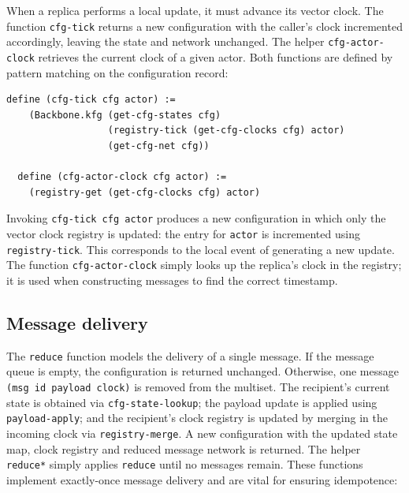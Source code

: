 When a replica performs a local update, it must advance its vector clock.  The function \lstinline{cfg-tick} returns a new configuration with the caller’s clock incremented accordingly, leaving the state and network unchanged.  The helper \lstinline{cfg-actor-clock} retrieves the current clock of a given actor.  Both functions are defined by pattern matching on the configuration record:

\begin{lstlisting}[language=Athena,style=athena]
  define (cfg-tick cfg actor) :=
    (Backbone.kfg (get-cfg-states cfg)
                  (registry-tick (get-cfg-clocks cfg) actor)
                  (get-cfg-net cfg))

  define (cfg-actor-clock cfg actor) :=
    (registry-get (get-cfg-clocks cfg) actor)
\end{lstlisting}

Invoking \lstinline{cfg-tick cfg actor} produces a new configuration in which only the vector clock registry is updated: the entry for \lstinline{actor} is incremented using \lstinline{registry-tick}.  This corresponds to the local event of generating a new update.  The function \lstinline{cfg-actor-clock} simply looks up the replica’s clock in the registry; it is used when constructing messages to find the correct timestamp.

\subsection{Message delivery}

The \texttt{reduce} function models the delivery of a single message.  If the message queue is empty, the configuration is returned unchanged.  Otherwise, one message \lstinline{(msg id payload clock)} is removed from the multiset.  The recipient’s current state is obtained via \lstinline{cfg-state-lookup}; the payload update is applied using \lstinline{payload-apply}; and the recipient’s clock registry is updated by merging in the incoming clock via \lstinline{registry-merge}.  A new configuration with the updated state map, clock registry and reduced message network is returned.  The helper \lstinline{reduce*} simply applies \lstinline{reduce} until no messages remain.  These functions implement exactly-once message delivery and are vital for ensuring idempotence:

